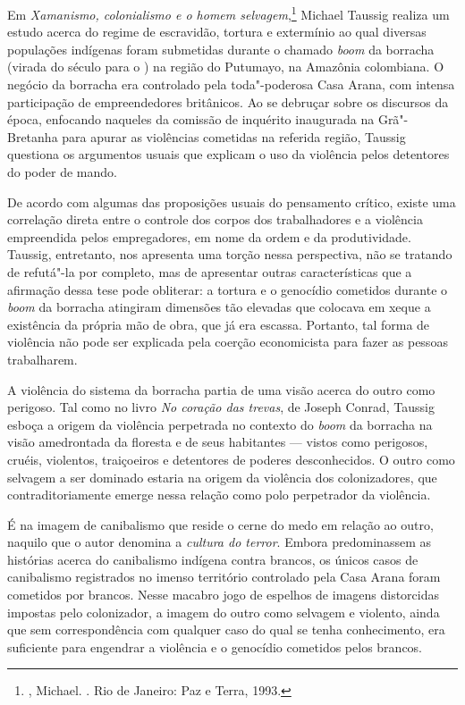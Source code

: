 Em \emph{Xamanismo, colonialismo e o homem selvagem},\footnote{, Michael. {}. Rio de Janeiro: Paz e Terra, 1993.} Michael Taussig
realiza um estudo acerca do regime de escravidão, tortura e extermínio
ao qual diversas populações indígenas foram submetidas durante o chamado
\emph{boom} da borracha (virada do século  para o ) na região do
Putumayo, na Amazônia
colombiana. O negócio da borracha era controlado pela toda"-poderosa Casa Arana, com intensa participação de empreendedores britânicos. Ao se
debruçar sobre os discursos da época, enfocando naqueles da comissão de
inquérito inaugurada na Grã"-Bretanha para apurar as violências cometidas
na referida região, Taussig questiona os argumentos usuais que explicam
o uso da violência pelos detentores do poder de mando.


De acordo com algumas das proposições usuais do pensamento crítico,
existe uma correlação direta entre o controle dos corpos dos
trabalhadores e a violência empreendida pelos empregadores, em nome da
ordem e da produtividade. Taussig, entretanto, nos apresenta uma torção
nessa perspectiva, não se tratando de refutá"-la por completo, mas de
apresentar outras características que a afirmação dessa tese pode obliterar:
a tortura e o genocídio cometidos durante o \emph{boom} da borracha
atingiram dimensões tão elevadas que colocava em xeque a existência da
própria mão de obra, que já era escassa. Portanto, tal forma de violência não pode ser explicada pela coerção economicista para fazer as pessoas trabalharem.

A violência do sistema da borracha partia de uma visão acerca do outro como perigoso. Tal como no livro \emph{No coração das trevas}, de Joseph Conrad, Taussig esboça a
origem da violência perpetrada no contexto do \emph{boom} da borracha na
visão amedrontada da floresta e de seus habitantes --- vistos como
perigosos, cruéis, violentos, traiçoeiros e detentores de poderes
desconhecidos. O outro como selvagem a ser dominado estaria na origem da
violência dos colonizadores, que contraditoriamente emerge nessa relação
como polo perpetrador da violência.

É na imagem de canibalismo que reside o cerne do medo em relação ao
outro, naquilo que o autor denomina a \emph{cultura do terror}. Embora
predominassem as histórias acerca do canibalismo indígena contra
brancos, os únicos casos de canibalismo registrados no imenso território
controlado pela Casa Arana foram cometidos por brancos. Nesse macabro
jogo de espelhos de imagens distorcidas impostas pelo colonizador, a
imagem do outro como selvagem e violento, ainda que sem correspondência
com qualquer caso do qual se tenha conhecimento, era suficiente para
engendrar a violência e o genocídio cometidos pelos brancos.

